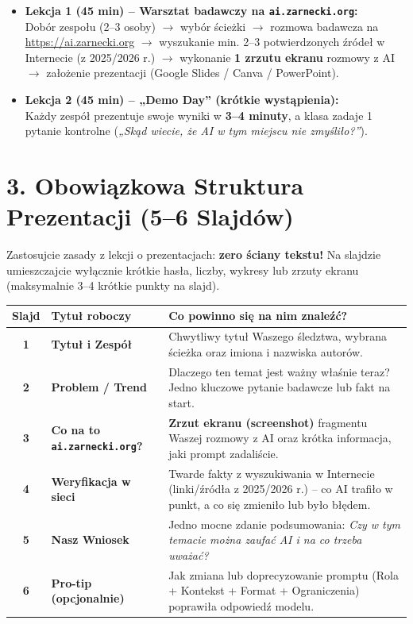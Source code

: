 \documentclass[11pt,a4paper]{article}
\begin{document}
\begin{itemize}
    \item \textbf{Lekcja 1 (45 min) -- Warsztat badawczy na \texttt{ai.zarnecki.org}:}\\
    Dobór zespołu (2--3 osoby) $\rightarrow$ wybór ścieżki $\rightarrow$ rozmowa badawcza na \url{https://ai.zarnecki.org} $\rightarrow$ wyszukanie min. 2--3 potwierdzonych źródeł w Internecie (z 2025/2026 r.) $\rightarrow$ wykonanie \textbf{1 zrzutu ekranu} rozmowy z AI $\rightarrow$ założenie prezentacji (Google Slides / Canva / PowerPoint).
    \item \textbf{Lekcja 2 (45 min) -- „Demo Day” (krótkie wystąpienia):}\\
    Każdy zespół prezentuje swoje wyniki w \textbf{3--4 minuty}, a klasa zadaje 1 pytanie kontrolne (\emph{„Skąd wiecie, że AI w tym miejscu nie zmyśliło?”}).
\end{itemize}

\newpage

\section{3. Obowiązkowa Struktura Prezentacji (5--6 Slajdów)}

Zastosujcie zasady z lekcji o prezentacjach: \textbf{zero ściany tekstu!} Na slajdzie umieszczajcie wyłącznie krótkie hasła, liczby, wykresy lub zrzuty ekranu (maksymalnie 3--4 krótkie punkty na slajd).

\begin{center}
\begin{tabularx}{\textwidth}{@{} c l X @{}}
\toprule
\textbf{Slajd} & \textbf{Tytuł roboczy} & \textbf{Co powinno się na nim znaleźć?} \\
\midrule
\textbf{1} & \textbf{Tytuł i Zespół} & Chwytliwy tytuł Waszego śledztwa, wybrana ścieżka oraz imiona i nazwiska autorów. \\
\midrule
\textbf{2} & \textbf{Problem / Trend} & Dlaczego ten temat jest ważny właśnie teraz? Jedno kluczowe pytanie badawcze lub fakt na start. \\
\midrule
\textbf{3} & \textbf{Co na to \texttt{ai.zarnecki.org}?} & \textbf{Zrzut ekranu (screenshot)} fragmentu Waszej rozmowy z AI oraz krótka informacja, jaki prompt zadaliście. \\
\midrule
\textbf{4} & \textbf{Weryfikacja w sieci} & Twarde fakty z wyszukiwania w Internecie (linki/źródła z 2025/2026 r.) -- co AI trafiło w punkt, a co się zmieniło lub było błędem. \\
\midrule
\textbf{5} & \textbf{Nasz Wniosek} & Jedno mocne zdanie podsumowania: \emph{Czy w tym temacie można zaufać AI i na co trzeba uważać?} \\
\midrule
\textbf{6} & \textbf{Pro-tip (opcjonalnie)} & Jak zmiana lub doprecyzowanie promptu (Rola + Kontekst + Format + Ograniczenia) poprawiła odpowiedź modelu. \\
\bottomrule
\end{tabularx}
\end{center}
\end{document}
